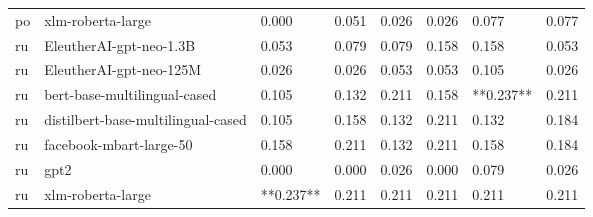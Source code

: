 \begin{tabular}{llllllll}
      po &                  xlm-roberta-large &     0.000 &                     0.051 &                 0.026 &                  0.026 &                                   0.077 &     0.077 \\
      ru &            EleutherAI-gpt-neo-1.3B &     0.053 &                     0.079 &                 0.079 &                  0.158 &                                   0.158 &     0.053 \\
      ru &            EleutherAI-gpt-neo-125M &     0.026 &                     0.026 &                 0.053 &                  0.053 &                                   0.105 &     0.026 \\
      ru &       bert-base-multilingual-cased &     0.105 &                     0.132 &                 0.211 &                  0.158 &                               **0.237** &     0.211 \\
      ru & distilbert-base-multilingual-cased &     0.105 &                     0.158 &                 0.132 &                  0.211 &                                   0.132 &     0.184 \\
      ru &            facebook-mbart-large-50 &     0.158 &                     0.211 &                 0.132 &                  0.211 &                                   0.158 &     0.184 \\
      ru &                               gpt2 &     0.000 &                     0.000 &                 0.026 &                  0.000 &                                   0.079 &     0.026 \\
      ru &                  xlm-roberta-large & **0.237** &                     0.211 &                 0.211 &                  0.211 &                                   0.211 &     0.211 \\
\bottomrule
\end{tabular}
